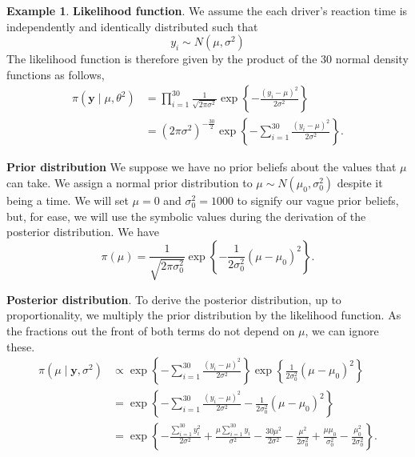 \documentclass[
]{book}
\theoremstyle{definition}
\theoremstyle{definition}
\newtheorem{example}{Example}[chapter]
\theoremstyle{definition}
\theoremstyle{definition}
\theoremstyle{remark}
\begin{document}
\begin{example}
\textbf{Likelihood function}. We assume the each driver's reaction time is independently and identically distributed such that
\[
y_i \sim N(\mu, \sigma^2)
\]
The likelihood function is therefore given by the product of the 30 normal density functions as follows,
\begin{align*}
\pi(\boldsymbol{y} \mid \mu, \theta^2) &= \prod_{i=1}^{30} \frac{1}{\sqrt{2\pi\sigma^2}}\exp\left\{-\frac{(y_i - \mu)^2}{2\sigma^2}\right\} \\
&= (2\pi\sigma^2)^{-\frac{30}{2}}\exp\left\{-\sum_{i=1}^{30}\frac{(y_i - \mu)^2}{2\sigma^2}\right\}.
\end{align*}

\textbf{Prior distribution} We suppose we have no prior beliefs about the values that \(\mu\) can take. We assign a normal prior distribution to \(\mu \sim N(\mu_0, \sigma_0^2)\) despite it being a time. We will set \(\mu = 0\) and \(\sigma_0^2 = 1000\) to signify our vague prior beliefs, but, for ease, we will use the symbolic values during the derivation of the posterior distribution. We have
\[
\pi(\mu) = \frac{1}{\sqrt{2\pi\sigma_0^2}}\exp\left\{-\frac{1}{2\sigma_0^2}(\mu - \mu_0)^2\right\}.
\]

\textbf{Posterior distribution}. To derive the posterior distribution, up to proportionality, we multiply the prior distribution by the likelihood function. As the fractions out the front of both terms do not depend on \(\mu\), we can ignore these.
\begin{align*}
\pi(\mu \mid \boldsymbol{y}, \sigma^2) &\propto\exp\left\{-\sum_{i=1}^{30}\frac{(y_i - \mu)^2}{2\sigma^2}\right\}  \exp\left\{\frac{1}{2\sigma_0^2}(\mu - \mu_0)^2\right\} \\
& = \exp\left\{-\sum_{i=1}^{30}\frac{(y_i - \mu)^2}{2\sigma^2}-\frac{1}{2\sigma_0^2}(\mu - \mu_0)^2\right\} \\
& = \exp\left\{-\frac{\sum_{i=1}^{30}y_i^2}{2\sigma^2} + \frac{\mu\sum_{i=1}^{30}y_i}{\sigma^2} - \frac{30\mu^2}{2\sigma^2} - \frac{\mu^2}{2\sigma_0^2} + \frac{\mu\mu_0}{\sigma_0^2} - \frac{\mu_0^2}{2\sigma_0^2}\right\}.
\end{align*}


\end{example}
\end{document}
